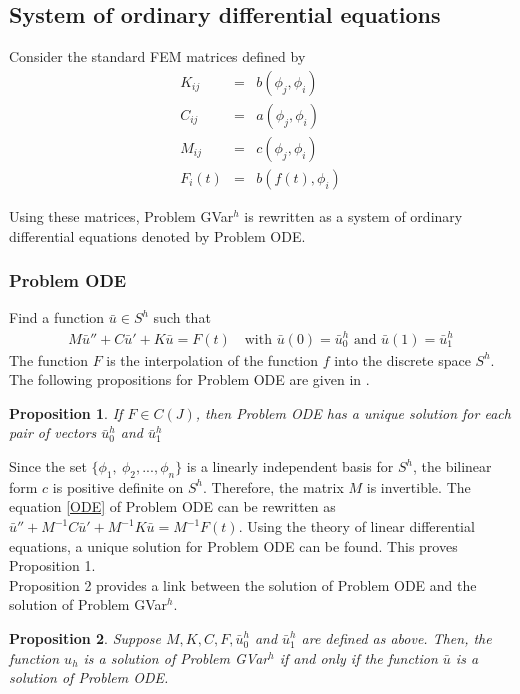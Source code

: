 \documentclass[../../main.tex]{subfiles}
\begin{document}
\subsection{System of ordinary differential equations}
Consider the standard FEM matrices defined by
\begin{eqnarray*}
	K_{ij} & = & b(\phi_j, \phi_i)\\
	C_{ij} & = & a(\phi_j, \phi_i)\\
	M_{ij} & = & c(\phi_j, \phi_i)\\
	F_{i}(t) & = & b(f(t), \phi_i)
\end{eqnarray*}

Using these matrices, Problem GVar$^h$ is rewritten as a system of ordinary differential equations denoted by Problem ODE.
\subsubsection*{Problem ODE}
Find a function $\bar{u} \in S^h$ such that
\begin{eqnarray}
	M\bar{u}'' + C \bar{u}' + K\bar{u} = F(t) \ \ \ \textrm{ with } \bar{u}(0) = \bar{u}^h_0 \textrm{ and }  \bar{u}(1) = \bar{u}^h_1 \label{ODE}
\end{eqnarray}
The function $F$ is the interpolation of the function $f$ into the discrete space $S^h$.\\

The following propositions for Problem ODE are given in \cite{BV13}.

\newtheorem{DC_Prop2}{Proposition}
\begin{DC_Prop2}
	If $F\in C(J)$, then Problem ODE has a unique solution for each pair of vectors $\bar{u}^h_0$ and $\bar{u}^h_1$
\end{DC_Prop2}

Since the set $\{\phi_1, \ \phi_2,...,\phi_n\}$ is a linearly independent basis for $S^h$, the bilinear form $c$ is positive definite on $S^h$. Therefore, the matrix $M$ is invertible. The equation \eqref{ODE} of Problem ODE can be rewritten as $\bar{u}'' + M^{-1}C\bar{u}' + M^{-1}K \bar{u} = M^{-1}F(t)$. Using the theory of linear differential equations, a unique solution for Problem ODE can be found. This proves Proposition 1.\\

Proposition 2 provides a link between the solution of Problem ODE and the solution of Problem GVar$^h$.

\newtheorem{DC_Prop3}[DC_Prop2]{Proposition}
\begin{DC_Prop3}
	Suppose $M, K, C, F,\bar{u}^h_0$ and $\bar{u}^h_1$ are defined as above. Then, the function $u_{h}$ is a solution of Problem GVar$^{h}$ if and only if the function $\bar{u}$ is a solution of Problem ODE.
\end{DC_Prop3}
\end{document}
